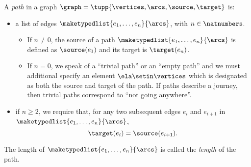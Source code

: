 \begin{definition}[Paths]
    \label{def:path}
    A \emph{path} in a graph $\graph=\tupp{\vertices,\arcs, \source,\target}$ is:

    \constit

\begin{itemize}
\item a list of edges $\maketypedlist{e_1, \dots, e_n}{\arcs}$, with $n \in \natnumbers$.
\begin{itemize}
\item If $n \neq 0$, the source of a path $\maketypedlist{e_1, \dots, e_n}{\arcs}$ is defined as $\source(e_1)$ and its target is $\target(e_n)$.
\item If $n = 0$, we speak of a ``trivial path'' or an ``empty path'' and we must additional specify an element $\ela \setin \vertices$ which is designated as both the source and target of the path. If paths describe a journey, then trivial paths correspond to ``not going anywhere''.
\end{itemize}
\end{itemize}

    \condit

    \begin{itemize}
        \item if $n \geq 2$, we require that, for any two subsequent edges $e_i$ and $e_{i+1}$ in $\maketypedlist{e_1, \dots, e_n}{\arcs}$,
              \begin{equation}
                  \target(e_i) = \source(e_{i+1}).
              \end{equation}
    \end{itemize}
    The length of $\maketypedlist{e_1, \dots, e_n}{\arcs}$ is called the \emph{length} of the path.
\end{definition}
